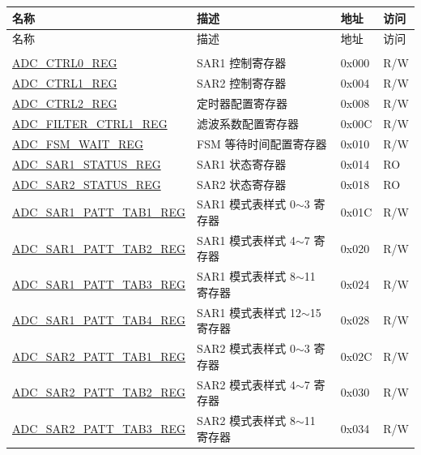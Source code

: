 \begin{longtable}{ | p{} | p{} | p{} | p{} | }
\hline\rowcolor{lightgray}
名称 & 描述 & 地址 & 访问 \\ \hline
\endfirsthead
\hline
\rowcolor{lightgray}
名称 & 描述 & 地址 & 访问\\
\hline
\endhead
\endfoot

\multicolumn{4}{|l|}{\textbf{配置寄存器}} \\ \hline
\hyperref[regdesc:ADCCTRL0REG]{ADC\_CTRL0\_REG} & SAR1 控制寄存器 & 0x000 & R/W \\\hline
\hyperref[regdesc:ADCCTRL1REG]{ADC\_CTRL1\_REG} & SAR2 控制寄存器 & 0x004 & R/W \\\hline
\hyperref[regdesc:ADCCTRL2REG]{ADC\_CTRL2\_REG} & 定时器配置寄存器 & 0x008 & R/W \\\hline
\hyperref[regdesc:ADCFILTERCTRL1REG]{ADC\_FILTER\_CTRL1\_REG} & 滤波系数配置寄存器 & 0x00C & R/W \\\hline
\hyperref[regdesc:ADCFSMWAITREG]{ADC\_FSM\_WAIT\_REG} & FSM 等待时间配置寄存器 & 0x010 & R/W \\\hline
\hyperref[regdesc:ADCSAR1STATUSREG]{ADC\_SAR1\_STATUS\_REG} & SAR1 状态寄存器 & 0x014 & RO \\\hline
\hyperref[regdesc:ADCSAR2STATUSREG]{ADC\_SAR2\_STATUS\_REG} & SAR2 状态寄存器 & 0x018 & RO \\\hline
\hyperref[regdesc:ADCSAR1PATTTAB1REG]{ADC\_SAR1\_PATT\_TAB1\_REG} & SAR1 模式表样式 0$\sim$3 寄存器 & 0x01C & R/W \\\hline
\hyperref[regdesc:ADCSAR1PATTTAB2REG]{ADC\_SAR1\_PATT\_TAB2\_REG} & SAR1 模式表样式 4$\sim$7 寄存器 & 0x020 & R/W \\\hline
\hyperref[regdesc:ADCSAR1PATTTAB3REG]{ADC\_SAR1\_PATT\_TAB3\_REG} & SAR1 模式表样式 8$\sim$11 寄存器 & 0x024 & R/W \\\hline
\hyperref[regdesc:ADCSAR1PATTTAB4REG]{ADC\_SAR1\_PATT\_TAB4\_REG} & SAR1 模式表样式 12$\sim$15 寄存器 & 0x028 & R/W \\\hline
\hyperref[regdesc:ADCSAR2PATTTAB1REG]{ADC\_SAR2\_PATT\_TAB1\_REG} & SAR2 模式表样式 0$\sim$3 寄存器 & 0x02C & R/W \\\hline
\hyperref[regdesc:ADCSAR2PATTTAB2REG]{ADC\_SAR2\_PATT\_TAB2\_REG} & SAR2 模式表样式 4$\sim$7 寄存器 & 0x030 & R/W \\\hline
\hyperref[regdesc:ADCSAR2PATTTAB3REG]{ADC\_SAR2\_PATT\_TAB3\_REG} & SAR2 模式表样式 8$\sim$11 寄存器 & 0x034 & R/W \\\hline

\end{longtable}
